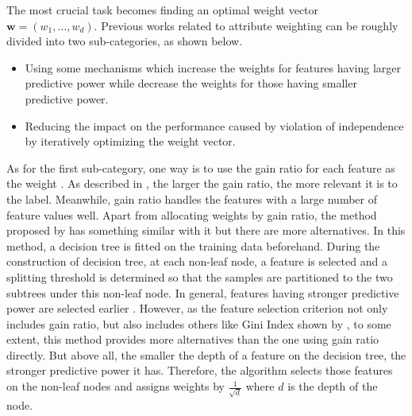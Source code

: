 \documentclass[twoside,11pt]{article}
\begin{document}
The most crucial task becomes finding an optimal weight vector $\mathbf{w}=(w_1,\dots,w_d)$. Previous works related to attribute weighting can be roughly divided into two sub-categories, as shown below.

\begin{itemize}
    \item Using some mechanisms which increase the weights for features having larger predictive power while decrease the weights for those having smaller predictive power.
    \item Reducing the impact on the performance caused by violation of independence by iteratively optimizing the weight vector.
\end{itemize}

As for the first sub-category, one way is to use the gain ratio for each feature as the weight \citep{zhang2004learning}. As described in \citet{salzberg1994c4}, the larger the gain ratio, the more relevant it is to the label. Meanwhile, gain ratio handles the features with a large number of feature values well. Apart from allocating weights by gain ratio, the method proposed by \citet{hall2006decision} has something similar with it but there are more alternatives. In this method, a decision tree is fitted on the training data beforehand. During the construction of decision tree, at each non-leaf node, a feature is selected and a splitting threshold is determined so that the samples are partitioned to the two subtrees under this non-leaf node. In general, features having stronger predictive power are selected earlier \citep{quinlan1986induction}. However, as the feature selection criterion not only includes gain ratio, but also includes others like Gini Index shown by \citet{han2011data}, to some extent, this method provides more alternatives than the one using gain ratio directly. But above all, the smaller the depth of a feature on the decision tree, the stronger predictive power it has. Therefore, the algorithm selects those features on the non-leaf nodes and assigns weights by $\frac{1}{\sqrt{d}}$ where $d$ is the depth of the node. 
\end{document}
